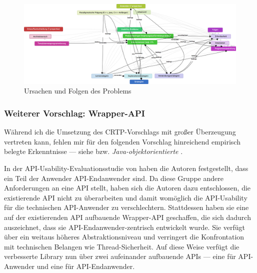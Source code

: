 \begin{figure}
\begin{minipage}{\textwidth}
  \centering
    \includegraphics[width=1.0\linewidth]{Figures/research/gt-stl.png}
  \caption{Ursachen und Folgen des Problems }
  \label{fig:research-gt-stl}
\end{minipage}
\end{figure}


\subsubsection{Weiterer Vorschlag: Wrapper-API}
\label{sec:seqan-improve-wrapper-api}

Während ich die Umsetzung des CRTP-Vorschlags mit großer Überzeugung vertreten kann, fehlen mir für den folgenden Vorschlag hinreichend empirisch belegte Erkenntnisse --- siehe  bzw. \textit{Java-objektorientierte} .

In der API-Usability-Evaluationsstudie von \cite{Stylos:2008cu} haben die Autoren festgestellt, dass ein Teil der Anwender API-Endanwender sind. Da diese Gruppe andere Anforderungen an eine API stellt, haben sich die Autoren dazu entschlossen, die existierende API nicht zu überarbeiten und damit womöglich die API-Usability für die technischen API-Anwender zu verschlechtern. Stattdessen haben sie eine auf der existierenden API aufbauende Wrapper-API geschaffen, die sich dadurch auszeichnet, dass sie API-Endanwender-zentrisch entwickelt wurde. Sie verfügt über ein weitaus höheres Abstraktionsniveau und verringert die Konfrontation mit technischen Belangen wie Thread-Sicherheit. Auf diese Weise verfügt die verbesserte Library nun über zwei aufeinander aufbauende APIs --- eine für API-Anwender und eine für API-Endanwender.

